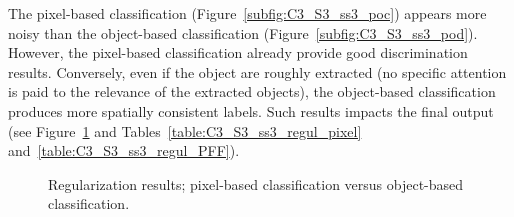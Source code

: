 The pixel-based classification (Figure~\ref{subfig:C3_S3_ss3_poc}) appears more noisy than the object-based classification (Figure~\ref{subfig:C3_S3_ss3_pod}). However, the pixel-based classification already provide good discrimination results. Conversely, even if the object are roughly extracted (no specific attention is paid to the relevance of the extracted objects), the object-based classification produces more spatially consistent labels. Such results impacts the final output (see Figure~\ref{fig:C3_S3_ss3_rpo} and Tables~\ref{table:C3_S3_ss3_regul_pixel} and~\ref{table:C3_S3_ss3_regul_PFF}).

\begin{figure}[htbp]
\begin{center}
\begingroup
\captionsetup[subfigure]{width=0.425\textwidth}
\hspace*{0.025\textwidth}
\endgroup
\caption{Regularization results; pixel-based classification versus object-based classification.}
\label{fig:C3_S3_ss3_rpo}
\end{center}
\end{figure}

